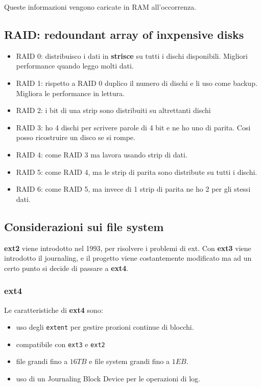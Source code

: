 Queste informazioni vengono caricate in RAM all'occorrenza.

\subsection{RAID: redoundant array of inxpensive disks}
\begin{itemize}
    \item RAID 0: distribuisco i dati in \textbf{strisce} su tutti i dischi disponibili. Migliori performance
    quando leggo molti dati.
    \item RAID 1: rispetto a RAID 0 duplico il numero di dischi e li uso come backup. Migliora le performance in lettura.
    \item RAID 2: i bit di una strip sono distribuiti su altrettanti dischi
    \item RAID 3: ho 4 dischi per scrivere parole di 4 bit e ne ho uno di parita. Cosi posso
    ricostruire un disco se si rompe.
    \item RAID 4: come RAID 3 ma lavora usando strip di dati. 
    \item RAID 5: come RAID 4, ma le strip di parita sono distribute su tutti i dischi.
    \item RAID 6: come RAID 5, ma invece di 1 strip di parita ne ho 2 per gli stessi dati.
\end{itemize}

\subsection{Considerazioni sui file system}
\textbf{ext2} viene introdotto nel 1993, per risolvere i problemi di ext.
Con \textbf{ext3} viene introdotto il journaling, e il progetto viene costantemente modificato
ma ad un certo punto si decide di passare a \textbf{ext4}.

\subsubsection{ext4}
Le caratteristiche di \textbf{ext4} sono:
\begin{itemize}
    \item uso degli \texttt{extent} per gestire prozioni continue di blocchi.
    \item compatibile con \texttt{ext3} e \texttt{ext2}
    \item file grandi fino a $16TB$ e file system grandi fino a $1EB.$
    \item uso di un Journaling Block Device per le operazioni di log.
\end{itemize}

